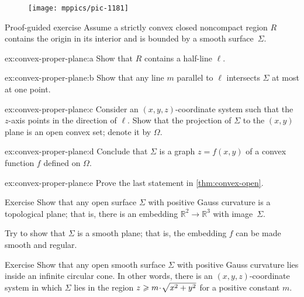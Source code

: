 {

\begin{wrapfigure}{r}{33 mm}
\vskip-0mm
\centering
\texttt{[image: mppics/pic-1181]}
\vskip2mm
\end{wrapfigure}


\begin{thm}{Proof-guided exercise}\label{ex:convex-proper-plane}
Assume a strictly convex closed noncompact region $R$ contains the origin in its interior and is bounded by a smooth surface~$\Sigma$.

\begin{subthm}{ex:convex-proper-plane:a}
Show that $R$ contains a half-line $\ell$.
\end{subthm}

\begin{subthm}{ex:convex-proper-plane:b}
Show that any line $m$ parallel to $\ell$ intersects $\Sigma$ at most at one point.
\end{subthm}


\begin{subthm}{ex:convex-proper-plane:c}
Consider an $(x,y,z)$-coordinate system such that the $z$-axis points in the direction of $\ell$.
Show that the projection of $\Sigma$ to the $(x,y)$ plane is an open convex set; denote it by $\Omega$.
\end{subthm}

\begin{subthm}{ex:convex-proper-plane:d}
Conclude that $\Sigma$ is a graph $z=f(x,y)$ of a convex function $f$ defined on $\Omega$.
\end{subthm}

\begin{subthm}{ex:convex-proper-plane:e}
Prove the last statement in \ref{thm:convex-open}.
\end{subthm}

\end{thm}

}

\begin{thm}{Exercise}\label{ex:open+convex=plane}
Show that any open surface $\Sigma$ with positive Gauss curvature is a topological plane;
that is, there is an embedding $\mathbb{R}^2\to\mathbb{R}^3$ with image~$\Sigma$.

Try to show that $\Sigma$ is a smooth plane;
that is, the embedding $f$ can be made smooth and regular.
\end{thm}


\begin{thm}{Exercise}\label{ex:circular-cone}
Show that any open smooth surface $\Sigma$ with positive Gauss curvature
lies inside an infinite circular cone.
In other words, there is an $(x,y,z)$-coordinate system in which $\Sigma$ lies in the region $z \z\ge m \cdot\sqrt{x^2 + y^2}$ for a positive constant $m$.
\end{thm} 

